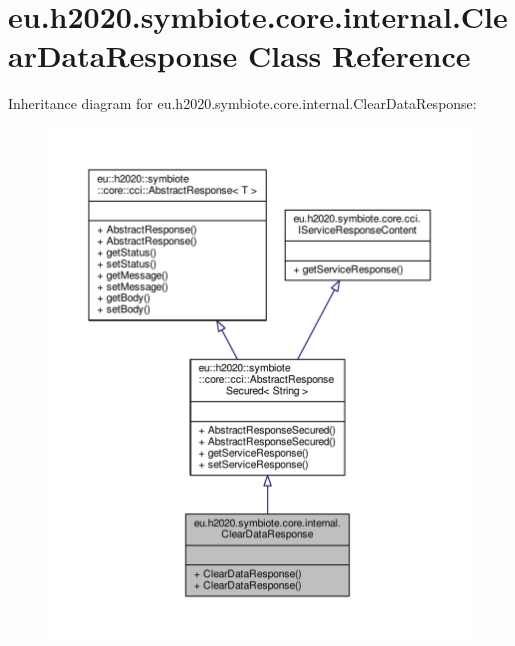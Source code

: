 \hypertarget{classeu_1_1h2020_1_1symbiote_1_1core_1_1internal_1_1ClearDataResponse}{}\section{eu.\+h2020.\+symbiote.\+core.\+internal.\+Clear\+Data\+Response Class Reference}
\label{classeu_1_1h2020_1_1symbiote_1_1core_1_1internal_1_1ClearDataResponse}


Inheritance diagram for eu.\+h2020.\+symbiote.\+core.\+internal.\+Clear\+Data\+Response\+:\nopagebreak
\begin{figure}[H]
\begin{center}
\leavevmode
\includegraphics[width=350pt]{classeu_1_1h2020_1_1symbiote_1_1core_1_1internal_1_1ClearDataResponse__inherit__graph}
\end{center}
\end{figure}


